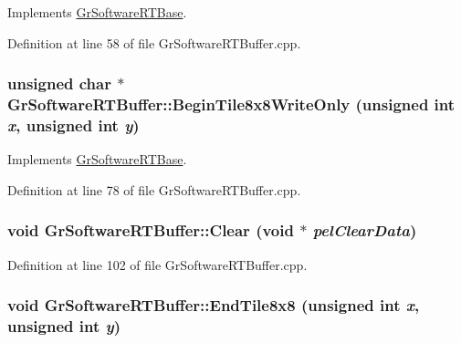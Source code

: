 Implements \hyperlink{class_gr_software_r_t_base_327778f4649ef0ac403a2eb9fde3031d}{GrSoftwareRTBase}.

Definition at line 58 of file GrSoftwareRTBuffer.cpp.\hypertarget{class_gr_software_r_t_buffer_f796e2b365ca4712537be3a927e565c6}{
\subsubsection[{BeginTile8x8WriteOnly}]{\setlength{\rightskip}{0pt plus 5cm}unsigned char $\ast$ GrSoftwareRTBuffer::BeginTile8x8WriteOnly (unsigned int {\em x}, \/  unsigned int {\em y})}}
\label{class_gr_software_r_t_buffer_f796e2b365ca4712537be3a927e565c6}




Implements \hyperlink{class_gr_software_r_t_base_8105b579f48de033a1f78c98b843d3e9}{GrSoftwareRTBase}.

Definition at line 78 of file GrSoftwareRTBuffer.cpp.\hypertarget{class_gr_software_r_t_buffer_2e475a40722932bba43e7f2c4f7c2f20}{
\subsubsection[{Clear}]{\setlength{\rightskip}{0pt plus 5cm}void GrSoftwareRTBuffer::Clear (void $\ast$ {\em pelClearData})}}
\label{class_gr_software_r_t_buffer_2e475a40722932bba43e7f2c4f7c2f20}




Definition at line 102 of file GrSoftwareRTBuffer.cpp.\hypertarget{class_gr_software_r_t_buffer_2e3662e5945e1f6df74f620f5b3b9b0f}{
\subsubsection[{EndTile8x8}]{\setlength{\rightskip}{0pt plus 5cm}void GrSoftwareRTBuffer::EndTile8x8 (unsigned int {\em x}, \/  unsigned int {\em y})}}
\label{class_gr_software_r_t_buffer_2e3662e5945e1f6df74f620f5b3b9b0f}




